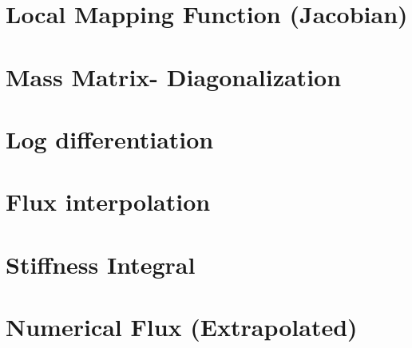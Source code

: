\documentclass{beamer}
\begin{document}
\section{Local Mapping Function (Jacobian)} 

\section{Mass Matrix- Diagonalization} 

\section{Log differentiation} 

\section{Flux interpolation} 

\section{Stiffness Integral} 

\section{Numerical Flux (Extrapolated)} 
\end{document}

